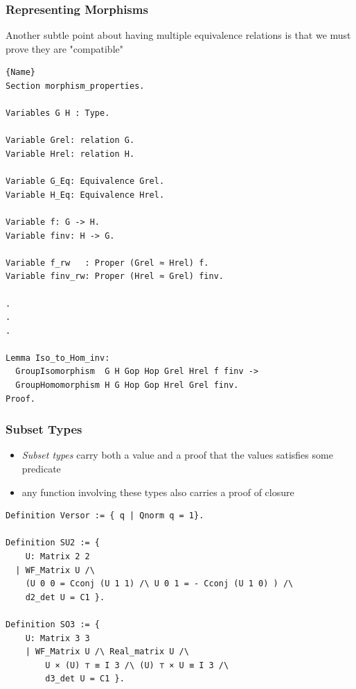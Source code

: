 \documentclass{beamer}
\begin{document}
\begin{frame}[fragile]
\frametitle{Representing Morphisms}

Another subtle point about having multiple equivalence relations is that we must prove they are "compatible"

\begin{lstlisting}[language=Coq, basicstyle=\tiny]{Name}
Section morphism_properties.

Variables G H : Type.

Variable Grel: relation G.
Variable Hrel: relation H.

Variable G_Eq: Equivalence Grel.
Variable H_Eq: Equivalence Hrel.

Variable f: G -> H.
Variable finv: H -> G.

Variable f_rw   : Proper (Grel ≈ Hrel) f.
Variable finv_rw: Proper (Hrel ≈ Grel) finv.

.
.
.

Lemma Iso_to_Hom_inv:
  GroupIsomorphism  G H Gop Hop Grel Hrel f finv ->
  GroupHomomorphism H G Hop Gop Hrel Grel finv.
Proof.

\end{lstlisting}

\end{frame}


\begin{frame}[fragile]
\frametitle{Subset Types}

\begin{itemize}
	\item \textit{Subset types} carry both a value and a proof that the values satisfies some predicate
	\item any function involving these types also carries a proof of closure
\end{itemize}

\begin{lstlisting}[language=Coq]
Definition Versor := { q | Qnorm q = 1}.

Definition SU2 := { 
	U: Matrix 2 2
  | WF_Matrix U /\                                                                               
    (U 0 0 = Cconj (U 1 1) /\ U 0 1 = - Cconj (U 1 0) ) /\
    d2_det U = C1 }.

Definition SO3 := { 
	U: Matrix 3 3 
	| WF_Matrix U /\ Real_matrix U /\ 
		U × (U) ⊤ ≡ I 3 /\ (U) ⊤ × U ≡ I 3 /\ 
		d3_det U = C1 }. 
\end{lstlisting}
\end{frame}
\end{document}
